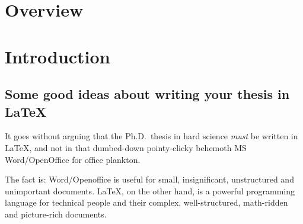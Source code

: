 \documentclass[a4paper,11pt,phdthesis,twoside,oneandhalfspace,pdflatex]{cssethesis} %
\begin{document}


\frontmatter					%

\thesistitlepage				%

\thesiscopyrightpage			%

\thesisdeclarationpage			%



\tableofcontents				%










\mainmatter	%



\chapter{Overview}





\chapter{Introduction}

\section{Some good ideas about writing your thesis in LaTeX}

It goes without arguing that the Ph.D.~thesis in hard science
\emph{must} be written in LaTeX, and not in that dumbed-down
pointy-clicky behemoth MS Word/OpenOffice for office plankton.

The fact is: Word/Openoffice is useful for small, insignificant,
unstructured and unimportant documents. LaTeX, on the other hand,
is a powerful programming language for technical people and their
complex, well-structured, math-ridden and picture-rich documents.
\end{document}
